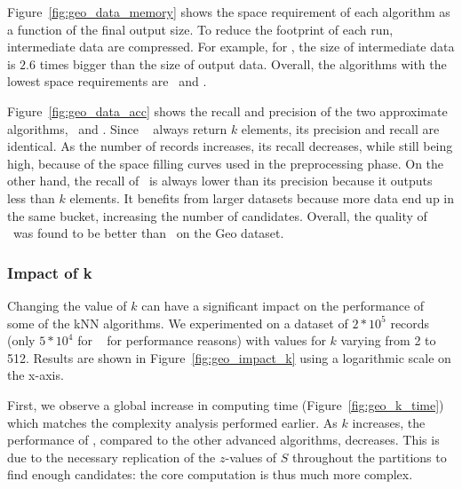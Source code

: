 Figure~\ref{fig:geo_data_memory} shows the space requirement of each algorithm as a function of the final output size. 
To 
reduce the footprint of each run, intermediate data are compressed. For example, for 
\HBNLJ, the size of intermediate data is $2.6$ times bigger than the size of output data. Overall, the algorithms with 
the
lowest space requirements are \LSH~and \VO.

Figure~\ref{fig:geo_data_acc} shows the recall and precision of the two approximate algorithms, \Z~and \LSH. Since \Z~
always return $k$ elements, its precision and recall are identical. 
As the number of records increases, its recall decreases, while still being high, because of the 
space filling curves used in the preprocessing phase.
On the other hand, the recall of \LSH~is always lower than its precision because it outputs less than $k$ elements. It
benefits from larger datasets because more data end up in the same bucket, increasing the 
number of candidates. Overall, the quality of \LSH~was found to be better than \Z~on the Geo dataset. 

%
\subsubsection{Impact of k}
Changing the value of $k$ can have a significant impact on the performance of some of the kNN 
algorithms. We experimented on a dataset of $2*10^5$ records (only $5*10^4$ for \HBNLJ~ 
for performance reasons) with values for $k$ varying from 2 to 512. Results are shown in 
Figure~\ref{fig:geo_impact_k} using a logarithmic scale on the x-axis.

First, we observe a global increase in computing time (Figure~\ref{fig:geo_k_time}) which matches the complexity 
analysis performed earlier. 
As $k$ increases, the performance of \Z, compared to the other advanced algorithms, decreases. This is due to the 
necessary replication of the $z$-values of $S$ throughout the partitions to find enough candidates: the core 
computation is thus much more complex. 

